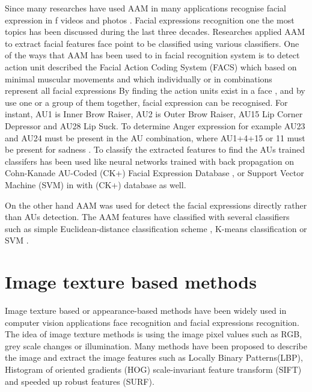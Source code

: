 Since \citet{edwards1998interpreting} many researches have used AAM in many applications  recognise facial expression in f videos \cite{sung2006real, martin2008real} and photos \cite{kanade2000comprehensive, van2005model,wu2013facial} . Facial expressions recognition one the most topics has been discussed during the last three decades. Researches applied AAM to extract facial features face point to be classified using various classifiers. One of the ways that AAM has been used to in facial recognition system is to detect action unit described the Facial Action Coding System (FACS) \cite{ekman1978facial} which based on minimal muscular movements  and which individually or in combinations  represent all facial expressions \citep{cohn1998feature, van2005model,lucey2010extended} By finding  the action units exist in a face , and by use one or a group of them together, facial expression can be recognised. For instant, AU1 is Inner Brow Raiser, AU2 is Outer Brow Raiser, AU15 Lip Corner Depressor and AU28 Lip Suck. To determine Anger expression for example AU23 and AU24 must be present in the AU combination, where AU1+4+15 or 11 must be present for sadness \cite{lucey2010extended}. 
To classify the extracted features to find the AUs trained classifers has been used like neural networks trained with back propagation \citet{van2005model} on Cohn-Kanade AU-Coded (CK+) Facial Expression Database \citet{kanade2000comprehensive}, or Support Vector Machine (SVM) in \citet{lucey2010extended} with (CK+) database as well.     

On the other hand AAM was used for detect the facial expressions directly rather than AUs detection. The AAM features have classified with several classifiers such as simple Euclidean-distance classification scheme \cite{ratliff2008emotion},  K-means classification \cite{martins2008facial} or SVM \citet{pu2015facial}.






\section{Image texture based methods}
Image texture based or appearance-based methods have been widely used in computer vision applications face recognition and facial expressions recognition. The idea of image texture methods is using the image pixel values such as RGB, grey scale changes or illumination. Many methods have been proposed to describe the image  and extract the image features such as Locally Binary Patterns(LBP), Histogram of oriented gradients (HOG) scale-invariant feature transform (SIFT) and speeded up robust features (SURF).






